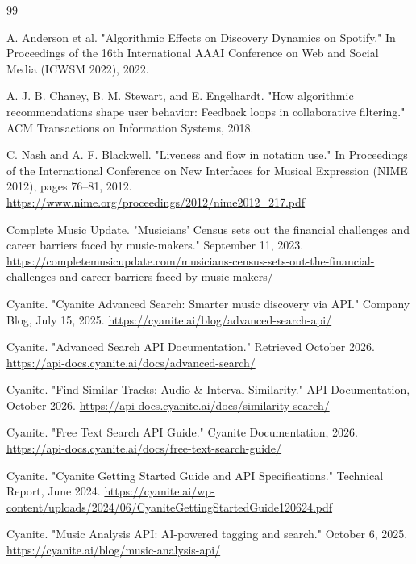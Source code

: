 \begin{thebibliography}{99}
\singlespace \small

  A. Anderson et al.
  "Algorithmic Effects on Discovery Dynamics on Spotify."
  In Proceedings of the 16th International AAAI Conference on Web and Social Media (ICWSM 2022), 2022.

  A. J. B. Chaney, B. M. Stewart, and E. Engelhardt.
  "How algorithmic recommendations shape user behavior: Feedback loops in collaborative filtering."
  ACM Transactions on Information Systems, 2018.

  C. Nash and A. F. Blackwell.
  "Liveness and flow in notation use."
  In Proceedings of the International Conference on New Interfaces for Musical Expression (NIME 2012), pages 76--81, 2012. \url{https://www.nime.org/proceedings/2012/nime2012_217.pdf}

  Complete Music Update.
  "Musicians' Census sets out the financial challenges and career barriers faced by music-makers."
  September 11, 2023. \url{https://completemusicupdate.com/musicians-census-sets-out-the-financial-challenges-and-career-barriers-faced-by-music-makers/}

  Cyanite.
  "Cyanite Advanced Search: Smarter music discovery via API."
  Company Blog, July 15, 2025. \url{https://cyanite.ai/blog/advanced-search-api/}

  Cyanite.
  "Advanced Search API Documentation."
  Retrieved October 2026. \url{https://api-docs.cyanite.ai/docs/advanced-search/}

  Cyanite.
  "Find Similar Tracks: Audio \& Interval Similarity."
  API Documentation, October 2026. \url{https://api-docs.cyanite.ai/docs/similarity-search/}

  Cyanite.
  "Free Text Search API Guide."
  Cyanite Documentation, 2026. \url{https://api-docs.cyanite.ai/docs/free-text-search-guide/}

  Cyanite.
  "Cyanite Getting Started Guide and API Specifications."
  Technical Report, June 2024. \url{https://cyanite.ai/wp-content/uploads/2024/06/CyaniteGettingStartedGuide120624.pdf}

  Cyanite.
  "Music Analysis API: AI-powered tagging and search."
  October 6, 2025. \url{https://cyanite.ai/blog/music-analysis-api/}


\end{thebibliography}
